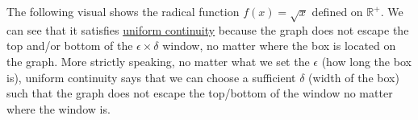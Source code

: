   \begin{example}
    \label{ex:uniformly-continuous}
    The following visual shows the radical function $f(x) = \sqrt{x}$ defined on $\mathbb{R}^+$. We can see that it satisfies \hyperref[def:uniform-continuity]{uniform continuity} because the graph does not escape the top and/or bottom of the $\epsilon \times \delta$ window, no matter where the box is located on the graph. More strictly speaking, no matter what we set the $\epsilon$ (how long the box is), uniform continuity says that we can choose a sufficient $\delta$ (width of the box) such that the graph does not escape the top/bottom of the window no matter where the window is. 

    \begin{figure}[H]
      \centering 
\end{figure}
\end{example}
